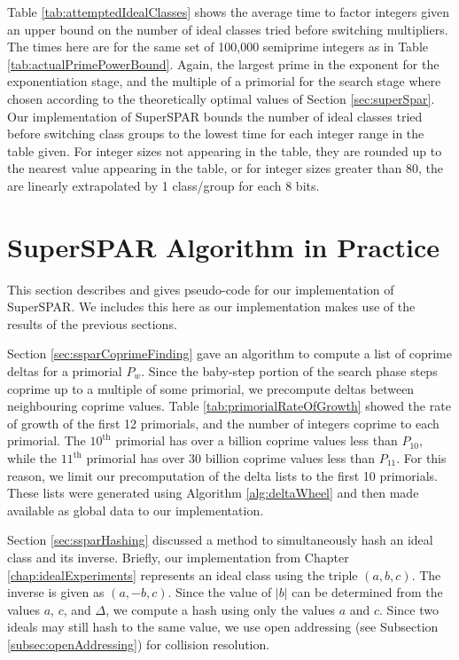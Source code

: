 \documentclass{ucalgthes1}
\theoremstyle{definition}
\begin{document}
Table \ref{tab:attemptedIdealClasses} shows the average time to factor integers given an upper bound on the number of ideal classes tried before switching multipliers.  The times here are for the same set of 100,000 semiprime integers as in Table \ref{tab:actualPrimePowerBound}.  Again, the largest prime in the exponent for the exponentiation stage, and the multiple of a primorial for the search stage where chosen according to the theoretically optimal values of Section \ref{sec:superSpar}.  Our implementation of SuperSPAR bounds the number of ideal classes tried before switching class groups to the lowest time for each integer range in the table given.  For integer sizes not appearing in the table, they are rounded up to the nearest value appearing in the table, or for integer sizes greater than 80, the are linearly extrapolated by 1 class/group for each 8 bits.

\section{SuperSPAR Algorithm in Practice}

This section describes and gives pseudo-code for our implementation of SuperSPAR.   We includes this here as our implementation makes use of the results of the previous sections.

Section \ref{sec:ssparCoprimeFinding} gave an algorithm to compute a list of coprime deltas for a primorial $P_w$.  Since the baby-step portion of the search phase steps coprime up to a multiple of some primorial, we precompute deltas between neighbouring coprime values.  Table \ref{tab:primorialRateOfGrowth} showed the rate of growth of the first 12 primorials, and the number of integers coprime to each primorial.  The $10^{\textrm{th}}$ primorial has over a billion coprime values less than $P_{10}$, while the $11^{\textrm{th}}$ primorial has over 30 billion coprime values less than $P_{11}$.  For this reason, we limit our precomputation of the delta lists to the first 10 primorials.  These lists were generated using Algorithm \ref{alg:deltaWheel} and then made available as global data to our implementation.

Section \ref{sec:ssparHashing} discussed a method to simultaneously hash an ideal class and its inverse.  Briefly, our implementation from Chapter \ref{chap:idealExperiments} represents an ideal class using the triple $(a, b, c)$.  The inverse is given as $(a, -b, c)$.  Since the value of $|b|$ can be determined from the values $a$, $c$, and $\Delta$, we compute a hash using only the values $a$ and $c$.   Since two ideals may still hash to the same value, we use open addressing (see Subsection \ref{subsec:openAddressing}) for collision resolution.
\end{document}
